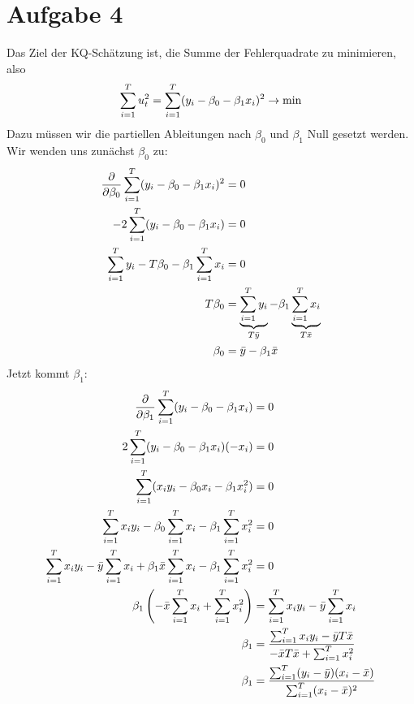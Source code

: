 \documentclass{article}
\begin{document}
	\section*{Aufgabe 4}
	Das Ziel der KQ-Schätzung ist, die Summe der Fehlerquadrate zu minimieren, also
	\begin{align}
		\sum_{i=1}^T u_t^2 = \sum_{i=1}^T (y_i-\beta_0 - \beta_1x_i)^2 \to\min \notag
	\end{align}
	Dazu müssen wir die partiellen Ableitungen nach $\beta_0$ und $\beta_1$ Null gesetzt werden. Wir wenden uns zunächst $\beta_0$ zu:
	\begin{align}
		\frac{\partial}{\partial\beta_0} \sum_{i=1}^T (y_i-\beta_0-\beta_1x_i)^2 &= 0 \notag \\
		-2\sum_{i=1}^T (y_i-\beta_0-\beta_1x_i) &= 0 \notag \\
		\sum_{i=1}^T y_i - T\beta_0 - \beta_1\sum_{i=1}^T x_i &= 0 \notag \\
		T\beta_0 &= \underbrace{\sum_{i=1}^T y_i}_{T\bar{y}} - \beta_1\underbrace{\sum_{i=1}^T x_i}_{T\bar{x}} \notag \\
		\beta_0 &= \bar{y} - \beta_1\bar{x} \notag
	\end{align}
	Jetzt kommt $\beta_1$:
	\begin{align}
		\frac{\partial}{\partial\beta_1} \sum_{i=1}^T(y_i-\beta_0-\beta_1x_i) &= 0 \notag \\
		2\sum_{i=1}^T (y_i-\beta_0-\beta_1x_i)(-x_i) &= 0 \notag \\
		\sum_{i=1}^T (x_iy_i - \beta_0x_i - \beta_1x_i^2) &= 0 \notag \\
		\sum_{i=1}^T x_iy_i - \beta_0\sum_{i=1}^T x_i - \beta_1\sum_{i=1}^T x_i^2 &= 0 \notag \\
		\sum_{i=1}^T x_iy_i - \bar{y}\sum_{i=1}^T x_i + \beta_1\bar{x}\sum_{i=1}^T x_i - \beta_1\sum_{i=1}^T x_i^2 &= 0 \notag \\
		\beta_1\left(-\bar{x}\sum_{i=1}^T x_i + \sum_{i=1}^T x_i^2\right) &= \sum_{i=1}^T x_iy_i - \bar{y}\sum_{i=1}^T x_i \notag \\
		\beta_1 &= \frac{\sum_{i=1}^T x_iy_i - \bar{y}T\bar{x}}{-\bar{x}T\bar{x} + \sum_{i=1}^T x_i^2} \notag \\
		\beta_1 &= \frac{\sum_{i=1}^T (y_i-\bar{y})(x_i-\bar{x})}{\sum_{i=1}^T (x_i-\bar{x})^2} \notag
	\end{align}
	
\end{document}
